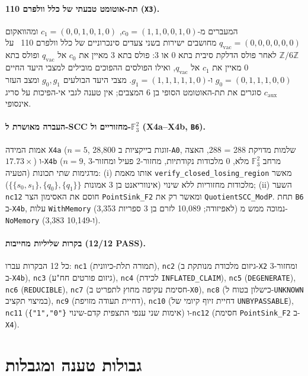 \documentclass[10pt,a4paper]{article}
\newcommand{\code}[1]{\foreignlanguage{english}{\nolinkurl{#1}}}
\newcommand{\ltr}[1]{\foreignlanguage{english}{#1}}
\begin{document}
\paragraph{תת-אוטומט טבעתי של כלל וולפרם 110 (\code{X3}).}
המעברים מ-$c_0 = (1,1,0,0,1,0)$, $c_1 = (0,0,1,0,1,0)$ ומהוואקום $q_{\mathrm{vac}} = (0,0,0,0,0,0)$ מחושבים ישירות בשני צעדים סינכרוניים של כלל וולפרם 110~\cite{wolfram1983,cook2004} על $\mathbb{Z}/6\mathbb{Z}$ לאחר פולס הדלקת סיבית בתא 0 או 3: פולס בתא 3 מאיין את $c_0$ אל $q_{\mathrm{vac}}$ ופולס בתא 0 מאיין את $c_1$ אל $q_{\mathrm{vac}}$, ואילו הפולסים ההפוכים מובילים למצבי היעד החיים $g_0 = (0,1,1,1,0,0)$ ו-$g_1 = (1,1,1,1,1,0)$. מצבי היעד הבולעים $g_0, g_1$ ומצב העזר $c_{\mathrm{aux}}$ סוגרים את תת-האוטומט הסופי בן 6 המצבים; אין טענה לגבי אי-הפיכות על סריג אינסופי.

\paragraph{העברה מאושרת ל-\ltr{SCC} מחזוריים ול-$\mathbb{F}_3^2$ (\ltr{X4a--X4b}, \code{B6}).}
אמות המידה \code{X4a} ($n=5$, 28,800 זוגות בייקציות ב-\code{A0}, שלמות מדויקת \ltr{288 = 288}, האצה $17.73\times$) ו-\code{X4b} ($n=9$, מרחב $\mathbb{F}_3^2$ מלא, 0 מלכודות נקודתיות, מחזור-2 פעיל ומחזור-3 הטעיה) מדגימות שתי תכונות: (i) אותו מאמת \code{verify_closed_losing_region} מאשר מלכודות מחזוריות ללא שינוי (אינווריאנט בן 3 אמונות $\{\{s_0,s_1\},\{q_0\},\{q_1\}\}$); (ii) השער \code{nc12} חוסם את האסימון הצר \code{PointSink_F2} ומאשר רק את \code{QuotientSCC_ModP}. תחת \code{B6} ב-\code{X4b}, עלות \code{WithMemory} (3,353 לאפיזודה; 10,089 לזרם בן 3 ספריות) נמוכה ממש מ-\code{NoMemory} (3,383 ו-10,149).

\paragraph{בקרות שליליות מחייבות (\ltr{12/12 PASS}).}
כל 12 הבקרות עברו: \code{nc1} (תמורה תלת-כיוונית), \code{nc2} (גיזום מלכודת מנותקת ב-\code{X2} ומחזור-3 ב-\code{X4b}), \code{nc3} (גיזום פורטים חח"ע), \code{nc4} (לכידת \code{INFLATED_CLAIM}), \code{nc5} (\code{DEGENERATE}), \code{nc6} (\code{REDUCIBLE}), \code{nc7} (חסימת עקיפה מחוץ לתפריט ב-\code{X0}), \code{nc8} (כישלון בטוח ל-\code{UNKNOWN} במיצוי תקציב), \code{nc9} (דחיית תעודה מזויפת), \code{nc10} (דחיית זיוף קיומי של \code{UNBYPASSABLE}), \code{nc11} (אימות שני ענפי התצפית קדם-שינוי \ltr{\texttt{\{"0","1"\}}}) ו-\code{nc12} (חסימת \code{PointSink_F2} ב-\code{X4}).

\section{גבולות טענה ומגבלות}
\end{document}
